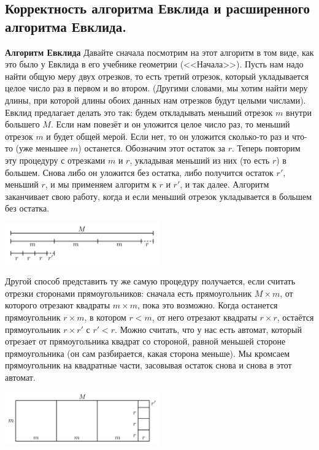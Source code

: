 \documentclass{article}
\begin{document}
\subsection{Корректность алгоритма Евклида и расширенного алгоритма Евклида.}
\textbf{Алгоритм Евклида}
\newline
\newline
Давайте сначала посмотрим на этот алгоритм в том виде, как это было у Евклида в его учебнике геометрии (<<Начала>>). Пусть нам надо найти общую меру двух отрезков, то есть третий отрезок, который укладывается целое число раз в первом и во втором. (Другими словами, мы хотим найти меру длины, при которой длины обоих данных нам отрезков будут целыми числами).
\newline
Евклид предлагает делать это так: будем откладывать меньший отрезок $m$ внутри большего $M$. Если нам повезёт и он уложится целое число раз, то меньший отрезок $m$ и будет общей мерой. Если нет, то он уложится сколько-то раз и что-то (уже меньшее $m$) останется. Обозначим этот остаток за $r$. Теперь повторим эту процедуру с отрезками $m$ и $r$, укладывая меньший из них (то есть $r$) в большем. Снова либо он уложится без остатка, либо получится остаток $r'$, меньший $r$, и мы применяем алгоритм к $r$ и $r'$, и так далее. Алгоритм заканчивает свою работу, когда и если меньший отрезок укладывается в большем без остатка.
\begin{center}
    \includegraphics[width=0.5\textwidth]{evklid1}
\end{center}
Другой способ представить ту же самую процедуру получается, если считать отрезки сторонами прямоугольников: сначала есть прямоугольник $M \times m$, от которого отрезают квадраты $m \times m$, пока это возможно. Когда останется прямоугольник $r \times m$, в котором $r < m$, от него отрезают квадраты $r \times r$, остаётся прямоугольник $r \times r'$ с $r' < r$. Можно считать, что у нас есть автомат, который отрезает от прямоугольника квадрат со стороной, равной меньшей стороне прямоугольника (он сам разбирается, какая сторона меньше). Мы кромсаем прямоугольник на квадратные части, засовывая остаток снова и снова в этот автомат.
\begin{center}
    \includegraphics[width=0.5\textwidth]{evklid2}
\end{center}
\end{document}
